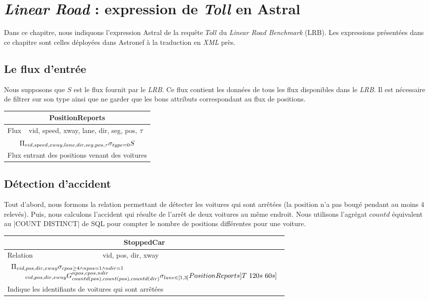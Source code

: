 \chapter{\textit{Linear Road} : expression de \textit{Toll} en Astral}\label{chap:misc:lrb}
\mtcaddchapter
\chaptertoc

\def\result#1#2#3#4#5{
\def\arraystretch{1.5}
\begin{tabular}{|p{0.2\textwidth}|p{0.75\textwidth}|}\bottomrule
 \multicolumn{2}{|c|}{\cellcolor{hypcolor}#1} \\ \hline
#2 & #3 \\ \hline
\multicolumn{2}{|c|}{$\displaystyle #4$}\\ \hline
\multicolumn{2}{|l|}{#5}\\ \toprule
\end{tabular}
\def\arraystretch{1}
}

Dans ce chapitre, nous indiquons l'expression Astral de la requête $Toll$ du \textit{Linear Road Benchmark} (LRB). Les expressions présentées dans ce chapitre sont celles déployées dans Astronef à la traduction en \textit{XML} près.

\section{Le flux d'entrée}
Nous supposons que $S$ est le flux fournit par le \textit{LRB}. Ce flux contient les données de tous les flux disponibles dans le \textit{LRB}. Il est nécessaire de filtrer sur son type ainsi que ne garder que les bons attributs correspondant au flux de positions.

\result{PositionReports}{Flux}{vid, speed, xway, lane, dir, seg, pos, $\tau$}
	{\Pi_{vid,speed,xway,lane,dir,seg,pos,\t}\sigma_{type=0} S}
	{Flux entrant des positions venant des voitures}

\section{Détection d'accident}
Tout d'abord, nous formons la relation permettant de détecter les voitures qui sont arrêtées (la position n'a pas bougé pendant au moins 4 relevés). Puis, nous calculons l'accident qui résulte de l'arrêt de deux voitures au même endroit. Nous utilisons l'agrégat $countd$ équivalent au \sql|COUNT DISTINCT| de SQL pour compter le nombre de positions différentes pour une voiture.

\result{StoppedCar}{Relation}{vid, pos, dir, xway}
	{\begin{array}{l}\Pi_{vid,pos,dir,xway}\sigma_{cpos \geq 4 \wedge npos = 1 \wedge ndir = 1}\\ \qquad\null_{vid,pos,dir,xway}G_{countd(pos), count(pos), countd(dir)}^{npos, cpos, ndir}\sigma_{lane \in [1,3]} PositionReports]T\ 120s\ 60s]\end{array}}
	{Indique les identifiants de voitures qui sont arrêtées}

